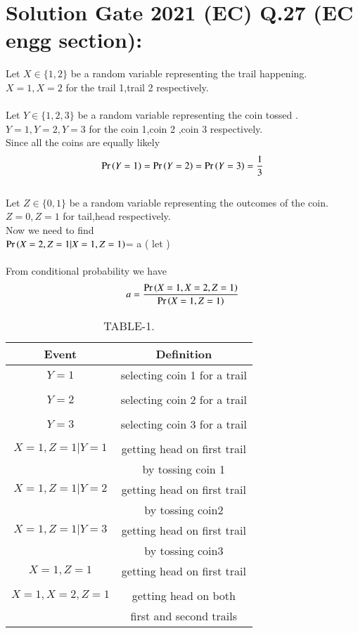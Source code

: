 \documentclass[journal,12pt,twocolumn]{IEEEtran}
\begin{document}
\section*{Solution Gate 2021 (EC) Q.27 (EC engg section):}
Let $X \in \{1,2\}$ be a random variable representing the trail happening.$X=1,X=2$ for  the trail 1,trail 2 respectively.\\
\\Let  $Y \in \{1,2,3\}$ be a random variable representing the coin tossed .$Y=1,Y=2,Y=3$ for the coin 1,coin 2 ,coin 3 respectively.
\\Since all the coins are equally likely
\begin{align}
    \Pr\left(Y=1\right)=\Pr\left(Y=2\right)=\Pr\left(Y=3\right)=\frac{1}{3}
\end{align}
\\Let $Z \in \{0,1\}$ be a random variable representing the outcomes of the coin.$Z=0,Z=1$ for tail,head respectively.\\
Now we need to find\\ $\Pr\left(X=2,Z=1|X=1,Z=1\right)$= a ( let )\\
\\From conditional probability we have
\begin{align}
    a=\frac{\Pr\left(X=1,X=2,Z=1\right)}{\Pr\left(X=1,Z=1\right)}
\end{align}
\begin{table}[h!]
    \resizebox{7cm}{!}
    {
    \begin{tabular}{|c|c|}
    \hline
        Event & Definition \\
         \hline
         $Y=1$ & selecting coin 1 for a trail\\&\\
         \hline
         $Y=2$ & selecting coin 2 for a trail\\&\\
         \hline
         $Y=3$ & selecting coin 3 for a trail\\&\\
         \hline
         $X=1,Z=1|Y=1$ & getting head on first trail
         \\ & by tossing coin 1\\
         \hline
         $X=1,Z=1|Y=2$ & getting head on first trail
         \\ & by tossing coin2 \\
         \hline
         $X=1,Z=1|Y=3$ & getting head on first trail
         \\ & by tossing coin3 \\
         \hline
         $X=1,Z=1$ & getting head on first trail\\&\\
         \hline
         $X=1,X=2,Z=1$ & getting head on both \\ &first and second trails\\
         \hline
    \end{tabular}
    }
    \caption{\label{tab:table-1}TABLE-1.}
\end{table}
\end{document}
